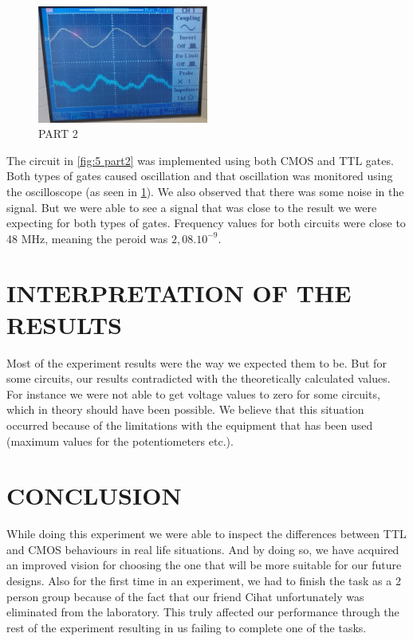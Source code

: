 \documentclass[pdftex,12pt,a4paper]{article}
\begin{document}
\begin{figure}[h]
    	\centering
    	\includegraphics[width=0.5\textwidth]{Osiloskop.png}
    	\caption{PART 2}
    	\label{fig:6 part2}
\end{figure}


\begin{flushleft}
The circuit in \ref{fig:5 part2} was implemented using both CMOS and TTL gates. Both types of gates caused oscillation and that oscillation was monitored using the oscilloscope (as seen in \ref{fig:6 part2}). We also observed that there was some noise in the signal. But we were able to see a signal that was close to the result we were expecting for both types of gates. Frequency values for both circuits were close to 48 MHz, meaning the peroid was $2,08.10^{-9}$.
\end{flushleft}
\newpage
\section{INTERPRETATION OF THE RESULTS}
Most of the experiment results were the way we expected them to be. But for some circuits, our results contradicted with the theoretically calculated values. For instance we were not able to get voltage values to zero for some circuits, which in theory should have been possible. We believe that this situation occurred because of the limitations with the equipment that has been used (maximum values for the potentiometers etc.).
\section{CONCLUSION}
While doing this experiment we were able to inspect the differences between TTL and CMOS behaviours in real life situations. And by doing so, we have acquired an improved vision for choosing the one that will be more suitable for our future designs. Also for the first time in an experiment, we had to finish the task as a 2 person group because of the fact that our friend Cihat unfortunately was eliminated from the laboratory. This truly affected our performance through the rest of the experiment resulting in us failing to complete one of the tasks.
\nocite{overleaf}
\nocite{reportGuide}
\newpage
{}



\end{document}
